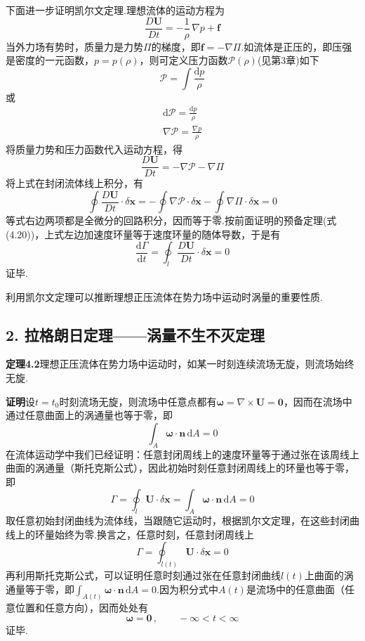 下面进一步证明凯尔文定理.理想流体的运动方程为
\[
\frac{D\boldsymbol{U}}{Dt}=-\frac{1}{\rho}\,\nabla p+\boldsymbol{f}
\]
当外力场有势时，质量力是力势$\Pi$的梯度，即$\boldsymbol{f}=-\nabla\Pi$.如流体是正压的，即压强是密度的一元函数，$p=p(\rho)$，则可定义压力函数$\mathscr{P}(\rho)$(见第3章)如下
\[
\mathscr{P}=\int\frac{\mathrm{d}p}{\rho}
\]
或
\begin{gather*}
\mathrm{d}\mathscr{P}=\frac{\mathrm{d}p}{\rho}\\[2pt]
\nabla\mathscr{P}=\frac{\nabla p}{\rho}
\end{gather*}
将质量力势和压力函数代入运动方程，得
\begin{equation*}
\frac{D\boldsymbol{U}}{Dt}=-\nabla\mathscr{P}-\nabla\Pi
\tag{4.21}
\end{equation*}
将上式在封闭流体线上积分，有
\[
\oint\frac{D\boldsymbol{U}}{Dt}\cdot\delta\boldsymbol{x}=-\oint\nabla\mathscr{P}\cdot\delta\boldsymbol{x}-\oint\nabla\Pi\cdot\delta\boldsymbol{x}=0
\]
等式右边两项都是全微分的回路积分，因而等于零.按前面证明的预备定理(式(4.20))，上式左边加速度环量等于速度环量的随体导数，于是有
\begin{equation*}
\frac{\mathrm{d}\Gamma}{\mathrm{d}t}=\oint_l\frac{D\boldsymbol{U}}{Dt}\cdot\delta\boldsymbol{x}=0
\tag{4.22}
\end{equation*}
证毕.

利用凯尔文定理可以推断理想正压流体在势力场中运动时涡量的重要性质.

\subsection*{2. 拉格朗日定理——涡量不生不灭定理}

\noindent\textbf{定理4.2}\quad 理想正压流体在势力场中运动时，如某一时刻连续流场无旋，则流场始终无旋.

\textbf{证明}\quad 设$t=t_0$时刻流场无旋，则流场中任意点都有$\boldsymbol{\omega}=\nabla\times\boldsymbol{U}=\boldsymbol{0}$，因而在流场中通过任意曲面上的涡通量也等于零，即
\[
\int_A\boldsymbol{\omega}\cdot\boldsymbol{n}\,\mathrm{d}A=0
\]
在流体运动学中我们已经证明：任意封闭周线上的速度环量等于通过张在该周线上曲面的涡通量（斯托克斯公式），因此初始时刻任意封闭周线上的环量也等于零，即
\[
\Gamma=\oint_l\boldsymbol{U}\cdot\delta\boldsymbol{x}=\int_A\boldsymbol{\omega}\cdot\boldsymbol{n}\,\mathrm{d}A=0
\]
取任意初始封闭曲线为流体线，当跟随它运动时，根据凯尔文定理，在这些封闭曲线上的环量始终为零.换言之，任意时刻，任意封闭周线上
\[
\Gamma=\oint_{l(t)}\boldsymbol{U}\cdot\delta\boldsymbol{x}=0
\]
再利用斯托克斯公式，可以证明任意时刻通过张在任意封闭曲线$l(t)$上曲面的涡通量等于零，即$\int_{A(t)}\boldsymbol{\omega}\cdot\boldsymbol{n}\,\mathrm{d}A=0$.因为积分式中$A(t)$是流场中的任意曲面（任意位置和任意方向），因而处处有
\[
\boldsymbol{\omega}=\boldsymbol{0}\,,\qquad -\infty<t<\infty
\]
证毕.

